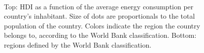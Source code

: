 \documentclass[my_thesis.tex]{subfiles}
\begin{document}
\begin{figure}
    \centering
    \\
    \centering
    \caption{Top: HDI as a function of the average energy consumption per country's inhabitant. Size of dots are proportionals to the total population of the country. Colors indicate the region the country belongs to, according to the World Bank classification. Bottom: regions defined by the World Bank classification.}
    \label{fig.hdi}
\end{figure}
\end{document}
